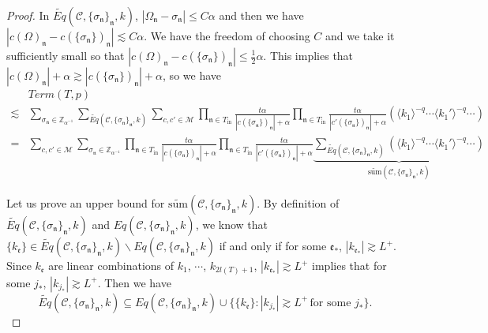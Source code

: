 \begin{proof}
In $\widetilde{Eq}(\mathcal{C}, \{\sigma_{\mathfrak{n}}\}_{\mathfrak{n}},k)$, $|\Omega_{\mathfrak{n}}-\sigma_{\mathfrak{n}}|\le C\alpha$ and then we have $|c(\Omega)_{\mathfrak{n}}-c(\{\sigma_{\mathfrak{n}}\})_{\mathfrak{n}}|\lesssim C\alpha$. We have the freedom of choosing $C$ and we take it sufficiently small so that $|c(\Omega)_{\mathfrak{n}}-c(\{\sigma_{\mathfrak{n}}\})_{\mathfrak{n}}|\le \frac{1}{2}\alpha$. This implies that $|c(\Omega)_{\mathfrak{n}}|+\alpha\gtrsim |c(\{\sigma_{\mathfrak{n}}\})_{\mathfrak{n}}|+\alpha$, so we have
\begin{equation}\label{eq.lemboundtermTp}
\begin{split}
    &Term(T, p)
    \\
    \lesssim& \sum_{\sigma_{\mathfrak{n}}\in \mathbb{Z}_{\alpha^{-1}}}\sum_{\widetilde{Eq}(\mathcal{C}, \{\sigma_{\mathfrak{n}}\}_{\mathfrak{n}},k)} \sum_{c,c'\in \mathscr{M} }\prod_{\mathfrak{n}\in T_{\text{in}}}\frac{t\alpha}{|c(\{\sigma_{\mathfrak{n}}\})_{\mathfrak{n}}|+\alpha} \prod_{\mathfrak{n}\in T_{\text{in}}}\frac{t\alpha}{|c'(\{\sigma_{\mathfrak{n}}\})_{\mathfrak{n}}|+\alpha} \left(\langle k_1\rangle^{-q}\cdots\langle k_1'\rangle^{-q}\cdots\right)
    \\
    =&\sum_{c,c'\in \mathscr{M} } \sum_{\sigma_{\mathfrak{n}}\in \mathbb{Z}_{\alpha^{-1}}} \prod_{\mathfrak{n}\in T_{\text{in}}}\frac{t\alpha}{|c(\{\sigma_{\mathfrak{n}}\})_{\mathfrak{n}}|+\alpha} \prod_{\mathfrak{n}\in T_{\text{in}}}\frac{t\alpha}{|c'(\{\sigma_{\mathfrak{n}}\})_{\mathfrak{n}}|+\alpha} \underbrace{\sum_{\widetilde{Eq}(\mathcal{C}, \{\sigma_{\mathfrak{n}}\}_{\mathfrak{n}},k)}\left(\langle k_1\rangle^{-q}\cdots\langle k_1'\rangle^{-q}\cdots\right)}_{\widetilde{\text{sum}}(\mathcal{C}, \{\sigma_{\mathfrak{n}}\}_{\mathfrak{n}},k)}
\end{split}
\end{equation}

Let us prove an upper bound for $\widetilde{\text{sum}}(\mathcal{C}, \{\sigma_{\mathfrak{n}}\}_{\mathfrak{n}},k)$. By definition of $\widetilde{Eq}(\mathcal{C}, \{\sigma_{\mathfrak{n}}\}_{\mathfrak{n}},k)$ and $Eq(\mathcal{C}, \{\sigma_{\mathfrak{n}}\}_{\mathfrak{n}},k)$, we know that $\{k_{\mathfrak{e}}\}\in \widetilde{Eq}(\mathcal{C}, \{\sigma_{\mathfrak{n}}\}_{\mathfrak{n}},k)\backslash Eq(\mathcal{C}, \{\sigma_{\mathfrak{n}}\}_{\mathfrak{n}},k)$ if and only if for some $\mathfrak{e}_{*}$, $|k_{\mathfrak{e}_*}|\gtrsim L^+$. Since $k_{\mathfrak{e}}$ are linear combinations of $k_1$, $\cdots$, $k_{2l(T)+1}$, $|k_{\mathfrak{e}_*}|\gtrsim L^+$ implies that for some $j_{*}$, $|k_{j_*}|\gtrsim L^+$. Then we have
\begin{equation}
    \widetilde{Eq}(\mathcal{C}, \{\sigma_{\mathfrak{n}}\}_{\mathfrak{n}},k)\subseteq Eq(\mathcal{C}, \{\sigma_{\mathfrak{n}}\}_{\mathfrak{n}},k)\cup \{\{k_{\mathfrak{e}}\}: |k_{j_*}|\gtrsim L^+\, \text{for some }j_*\}.
\end{equation}


\end{proof}
